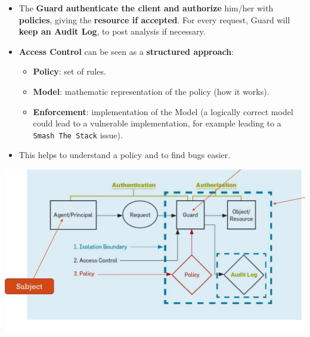 \documentclass[9pt, letterpaper]{article}
\begin{document}
\begin{itemize}
\begin{itemize}
	      \end{itemize}
	\item The \textbf{Guard authenticate the client and authorize} him/her with \textbf{policies}, giving the \textbf{resource if accepted}. For every request, Guard will \textbf{keep an Audit Log}, to post analysis if necessary.
	\item \textbf{Access Control} can be seen as a \textbf{structured approach}:
	      \begin{itemize}
		      \item \textbf{Policy}: set of rules.
		      \item \textbf{Model}: mathematic representation of the policy (how it works).
		      \item \textbf{Enforcement}: implementation of the Model (a logically correct model could lead to a vulnerable implementation, for example leading to a {\tt Smash The Stack} issue).
	      \end{itemize}
	\item This helps to understand a policy and to find bugs easier.
\end{itemize}
\includegraphics[scale=0.5]{AccessControl.jpg}
\end{document}
